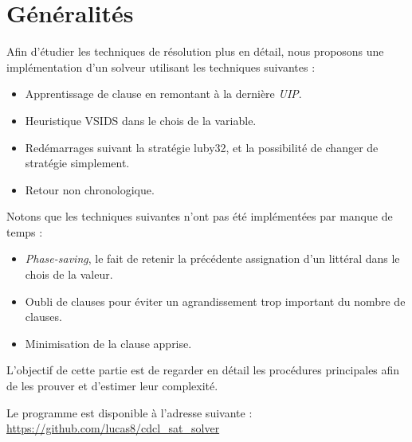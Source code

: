 \section{Généralités}
Afin d'étudier les techniques de résolution plus en détail, nous proposons une
implémentation d'un solveur utilisant les techniques suivantes :
\begin{itemize}
    \item Apprentissage de clause en remontant à la dernière \emph{UIP}.
    \item Heuristique VSIDS dans le chois de la variable.
    \item Redémarrages suivant la stratégie luby32, et la possibilité de
        changer de stratégie simplement.
    \item Retour non chronologique.
\end{itemize}

Notons que les techniques suivantes n'ont pas été implémentées par manque de
temps :
\begin{itemize}
    \item \emph{Phase-saving}, le fait de retenir la précédente assignation
        d'un littéral dans le chois de la valeur.
    \item Oubli de clauses pour éviter un agrandissement trop important du
        nombre de clauses.
    \item Minimisation de la clause apprise.
\end{itemize}

L'objectif de cette partie est de regarder en détail les procédures principales
afin de les prouver et d'estimer leur complexité.

Le programme est disponible à l'adresse suivante :
\url{https://github.com/lucas8/cdcl\_sat\_solver}

